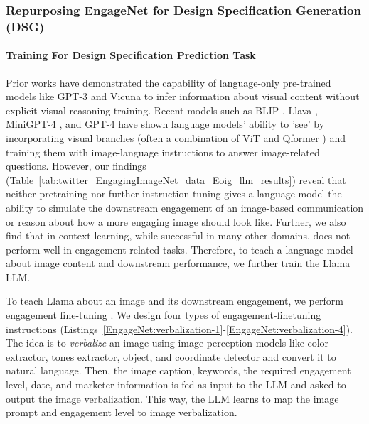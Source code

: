 



\subsubsection{Repurposing EngageNet for Design Specification Generation (DSG)}
\label{sec:EngageNet Content Simulation}

\paragraph{Training For Design Specification Prediction Task}
Prior works \cite{bhattacharya2023video} have demonstrated the capability of language-only pre-trained models like GPT-3 and Vicuna to infer information about visual content without explicit visual reasoning training. Recent models such as BLIP \cite{li2023blip2}, Llava \cite{liu2023visual}, MiniGPT-4 \cite{zhu2023minigpt}, and GPT-4 \cite{openai2023gpt4} have shown language models' ability to 'see' by incorporating visual branches (often a combination of ViT \cite{dosovitskiy2020image} and Qformer \cite{li2023blip2}) and training them with image-language instructions to answer image-related questions. 
However, our findings (Table~\ref{tab:twitter_EngagingImageNet_data_Eoig_llm_results}) reveal that neither pretraining nor further instruction tuning gives a language model the ability to simulate the downstream engagement of an image-based communication or reason about how a more engaging image should look like. Further, we also find that in-context learning, while successful in many other domains, does not perform well in engagement-related tasks. Therefore, to teach a language model about image content and downstream performance, we further train the Llama LLM.

To teach Llama about an image and its downstream engagement, we perform engagement fine-tuning \cite{khandelwal2023large}. We design four types of engagement-finetuning instructions (Listings~\ref{EngageNet:verbalization-1}-\ref{EngageNet:verbalization-4}). The idea is to \textit{verbalize} an image using image perception models like color extractor, tones extractor, object, and coordinate detector and convert it to natural language. Then, the image caption, keywords, the required engagement level, date, and marketer information is fed as input to the LLM and asked to output the image verbalization. This way, the LLM learns to map the image prompt and engagement level to image verbalization.

